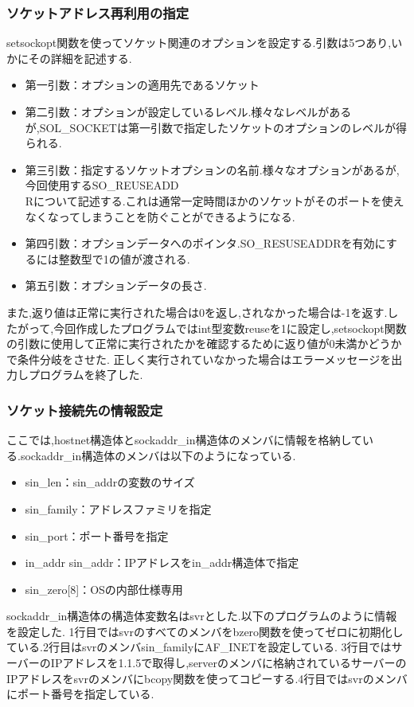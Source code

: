 \documentclass[dvipdfmx]{jarticle}
\begin{document}
\subsubsection{ソケットアドレス再利用の指定}
setsockopt関数を使ってソケット関連のオプションを設定する.引数は5つあり,いかにその詳細を記述する.\cite{3}\cite{4}
\begin{itemize}
    \item 第一引数：オプションの適用先であるソケット
    \item 第二引数：オプションが設定しているレベル.様々なレベルがあるが,SOL\_SOCKETは第一引数で指定したソケットのオプションのレベルが得られる.
    \item 第三引数：指定するソケットオプションの名前.様々なオプションがあるが,今回使用するSO\_REUSEADD\\Rについて記述する.これは通常一定時間ほかのソケットがそのポートを使えなくなってしまうことを防ぐことができるようになる.\cite{5}
    \item 第四引数：オプションデータへのポインタ.SO\_RESUSEADDRを有効にするには整数型で1の値が渡される.
    \item 第五引数：オプションデータの長さ.
\end{itemize}
また,返り値は正常に実行された場合は0を返し,されなかった場合は-1を返す.したがって,今回作成したプログラムではint型変数reuseを1に設定し,setsockopt関数の引数に使用して正常に実行されたかを確認するために返り値が0未満かどうかで条件分岐をさせた.
正しく実行されていなかった場合はエラーメッセージを出力しプログラムを終了した.
\subsubsection{ソケット接続先の情報設定}
ここでは,hostnet構造体とsockaddr\_in構造体のメンバに情報を格納している.sockaddr\_in構造体のメンバは以下のようになっている.\cite{6}\cite{7}
\begin{itemize}
    \item sin\_len：sin\_addrの変数のサイズ
    \item sin\_family：アドレスファミリを指定
    \item sin\_port：ポート番号を指定
    \item in\_addr sin\_addr：IPアドレスをin\_addr構造体で指定
    \item sin\_zero[8]：OSの内部仕様専用
\end{itemize}
sockaddr\_in構造体の構造体変数名はsvrとした.以下のプログラムのように情報を設定した.
1行目ではsvrのすべてのメンバをbzero関数を使ってゼロに初期化している.2行目はsvrのメンバsin\_familyにAF\_INETを設定している.
3行目ではサーバーのIPアドレスを1.1.5で取得し,serverのメンバに格納されているサーバーのIPアドレスをsvrのメンバにbcopy関数を使ってコピーする.4行目ではsvrのメンバにポート番号を指定している.
\end{document}
